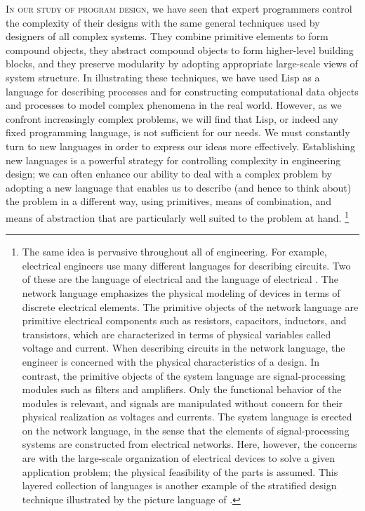 \lettrine{I}{n our study of program design}, we have seen that expert programmers control the complexity of their designs with the same general techniques used by designers of all complex systems.
They combine primitive elements to form compound objects, they abstract compound objects to form higher-level building blocks, and they preserve modularity by adopting appropriate large-scale views of system structure.
In illustrating these techniques, we have used Lisp as a language for describing processes and for constructing computational data objects and processes to model complex phenomena in the real world.
However, as we confront increasingly complex problems, we will find that Lisp, or indeed any fixed programming language, is not sufficient for our needs.
We must constantly turn to new languages in order to express our ideas more effectively.
Establishing new languages is a powerful strategy for controlling complexity in engineering design;
we can often enhance our ability to deal with a complex problem by adopting a new language that enables us to describe (and hence to think about) the problem in a different way, using primitives, means of combination, and means of abstraction that are particularly well suited to the problem at hand.%
\footnote{
	The same idea is pervasive throughout all of engineering.
	For example, electrical engineers use many different languages for describing circuits.
	Two of these are the language of electrical  and the language of electrical .
	The network language emphasizes the physical modeling of devices in terms of discrete electrical elements.
	The primitive objects of the network language are primitive electrical components such as resistors, capacitors, inductors, and transistors, which are characterized in terms of physical variables called voltage and current.
	When describing circuits in the network language, the engineer is concerned with the physical characteristics of a design.
	In contrast, the primitive objects of the system language are signal-processing modules such as filters and amplifiers.
	Only the functional behavior of the modules is relevant, and signals are manipulated without concern for their physical realization as voltages and currents.
	The system language is erected on the network language, in the sense that the elements of signal-processing systems are constructed from electrical networks.
	Here, however, the concerns are with the large-scale organization of electrical devices to solve a given application problem;
	the physical feasibility of the parts is assumed.
	This layered collection of languages is another example of the stratified design technique illustrated by the picture language of .
	}

